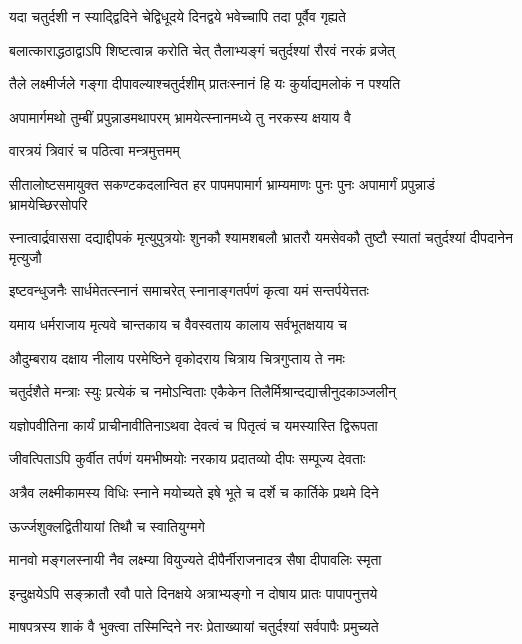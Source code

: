 \twolineshloka
{यदा चतुर्दशी न स्याद्द्विदिने चेद्विधूदये}
{दिनद्वये भवेच्चापि तदा पूर्वैव गृह्यते} %

\twolineshloka
{बलात्काराद्धठाद्वाऽपि शिष्टत्वान्न करोति चेत्}
{तैलाभ्यङ्गं चतुर्दश्यां रौरवं नरकं व्रजेत्} %

\twolineshloka
{तैले लक्ष्मीर्जले गङ्गा दीपावल्याश्चतुर्दशीम्}
{प्रातःस्नानं हि यः कुर्याद्यमलोकं न पश्यति} %

\twolineshloka
{अपामार्गमथो तुम्बीं प्रपुन्नाडमथापरम्}
{भ्रामयेत्स्नानमध्ये तु नरकस्य क्षयाय वै} %


\onelineshloka
{वारत्रयं त्रिवारं च पठित्वा मन्त्रमुत्तमम्} %

\threelineshloka
{सीतालोष्टसमायुक्त सकण्टकदलान्वित}
{हर पापमपामार्ग भ्राम्यमाणः पुनः पुनः}
{अपामार्गं प्रपुन्नाडं भ्रामयेच्छिरसोपरि} %

\threelineshloka
{स्नात्वार्द्रवाससा दद्याद्दीपकं मृत्युपुत्रयोः}
{शुनकौ श्यामशबलौ भ्रातरौ यमसेवकौ}
{तुष्टौ स्यातां चतुर्दश्यां दीपदानेन मृत्युजौ} %

\twolineshloka
{इष्टवन्धुजनैः सार्धमेतत्स्नानं समाचरेत्}
{स्नानाङ्गतर्पणं कृत्वा यमं सन्तर्पयेत्ततः} %

\twolineshloka
{यमाय धर्मराजाय मृत्यवे चान्तकाय च}
{वैवस्वताय कालाय सर्वभूतक्षयाय च} %

\twolineshloka
{औदुम्बराय दक्षाय नीलाय परमेष्ठिने}
{वृकोदराय चित्राय चित्रगुप्ताय ते नमः} %

\twolineshloka
{चतुर्दशैते मन्त्राः स्युः प्रत्येकं च नमोऽन्विताः}
{एकैकेन तिलैर्मिश्रान्दद्यात्त्रीनुदकाञ्जलीन्} %

\twolineshloka
{यज्ञोपवीतिना कार्यं प्राचीनावीतिनाऽथवा}
{देवत्वं च पितृत्वं च यमस्यास्ति द्विरूपता} %

\twolineshloka
{जीवत्पिताऽपि कुर्वीत तर्पणं यमभीष्मयोः}
{नरकाय प्रदातव्यो दीपः सम्पूज्य देवताः} %

\twolineshloka
{अत्रैव लक्ष्मीकामस्य विधिः स्नाने मयोच्यते}
{इषे भूते च दर्शे च कार्तिके प्रथमे दिने} %



\onelineshloka
{ऊर्ज्जशुक्लद्वितीयायां तिथौ च स्वातियुग्मगे} %

\twolineshloka
{मानवो मङ्गलस्नायी नैव लक्ष्म्या वियुज्यते}
{दीपैर्नीराजनादत्र सैषा दीपावलिः स्मृता} %

\twolineshloka
{इन्दुक्षयेऽपि सङ्क्रातौ रवौ पाते दिनक्षये}
{अत्राभ्यङ्गो न दोषाय प्रातः पापापनुत्तये} %

\twolineshloka
{माषपत्रस्य शाकं वै भुक्त्वा तस्मिन्दिने नरः}
{प्रेताख्यायां चतुर्दश्यां सर्वपापैः प्रमुच्यते} %

